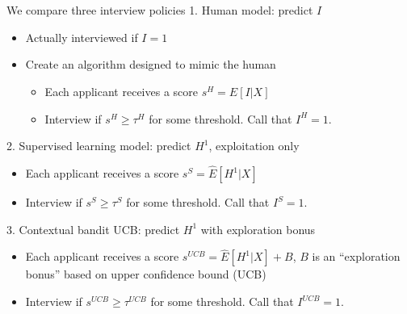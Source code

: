 \documentclass[aspectratio=169,t,11pt,table]{beamer}
\begin{document}
\begin{frame}{We compare three interview policies} \small 
\alert{1.  Human model: predict $I$} 
\begin{itemize}
\item Actually interviewed if $I=1$
\item Create an algorithm designed to mimic the human
\begin{itemize} \small 
\item Each applicant receives a score $s^{H} = \hat{E}[I | X]$
\item Interview if $s^{H} \geq \tau^{H}$ for some threshold.  Call that $I^{H}=1$.
\end{itemize}
\end{itemize}
\smallskip \pause 
\alert{2. Supervised learning model: predict $H^1$, exploitation only} \small 
\begin{itemize}
\item Each applicant receives a score $s^{S} = \hat{E}[H^1 | X]$
\item Interview if $s^{S} \geq \tau^{S}$ for some threshold.  Call that $I^{S}=1$.
\end{itemize}
\smallskip \pause
\alert{3.  Contextual bandit UCB: predict $H^1$ with exploration bonus} \small 
\begin{itemize}
\item Each applicant receives a score $s^{UCB} = \hat{E}[H^1 | X] + B$, $B$ is an ``exploration bonus'' based on upper confidence bound (UCB)
\item Interview if $s^{UCB} \geq \tau^{UCB}$ for some threshold.  Call that $I^{UCB}=1$.
\end{itemize}
\end{frame}
\end{document}
